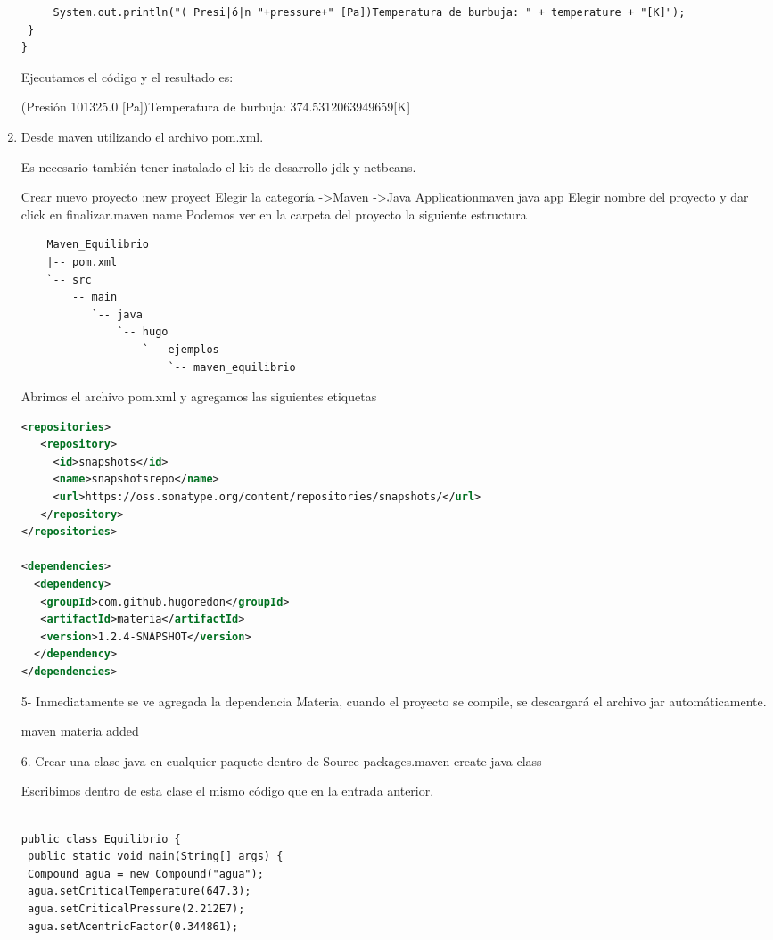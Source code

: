 \begin{enumerate}
\begin{lstlisting}
	 System.out.println("( Presi|ó|n "+pressure+" [Pa])Temperatura de burbuja: " + temperature + "[K]");
 }
}
\end{lstlisting}

Ejecutamos el código y el resultado es:

(Presión 101325.0 [Pa])Temperatura de burbuja: 374.5312063949659[K]



\item Desde maven utilizando el archivo pom.xml.

Es necesario también tener instalado el kit de desarrollo jdk y netbeans.

    Crear nuevo proyecto :new proyect
     Elegir la categoría ->Maven ->Java Applicationmaven java app
    Elegir nombre del proyecto y dar click en finalizar.maven name
    Podemos ver en la carpeta del proyecto la siguiente estructura
\begin{verbatim}
    Maven_Equilibrio
    |-- pom.xml
    `-- src
        -- main
           `-- java
               `-- hugo
                   `-- ejemplos
                       `-- maven_equilibrio
\end{verbatim}
Abrimos el archivo pom.xml y agregamos las siguientes etiquetas


\begin{lstlisting}[language=XML,morekeywords={repositories,
    repository,id,name,url,groupId,artifactId,dependencies,dependency}]
<repositories>
   <repository>
     <id>snapshots</id>
     <name>snapshotsrepo</name>
     <url>https://oss.sonatype.org/content/repositories/snapshots/</url>
   </repository>
</repositories>
 
<dependencies>
  <dependency>
   <groupId>com.github.hugoredon</groupId>
   <artifactId>materia</artifactId>
   <version>1.2.4-SNAPSHOT</version>
  </dependency>
</dependencies>
\end{lstlisting}


5- Inmediatamente se ve agregada la dependencia Materia, cuando el proyecto se compile, se descargará el archivo jar automáticamente.

maven materia added

6.  Crear una clase java en cualquier paquete dentro de Source packages.maven create java class

Escribimos dentro de esta clase el mismo código que en la entrada anterior.

\begin{lstlisting}
	
public class Equilibrio {
 public static void main(String[] args) {
 Compound agua = new Compound("agua");
 agua.setCriticalTemperature(647.3);
 agua.setCriticalPressure(2.212E7);
 agua.setAcentricFactor(0.344861);
 

\end{lstlisting}
\end{enumerate}
